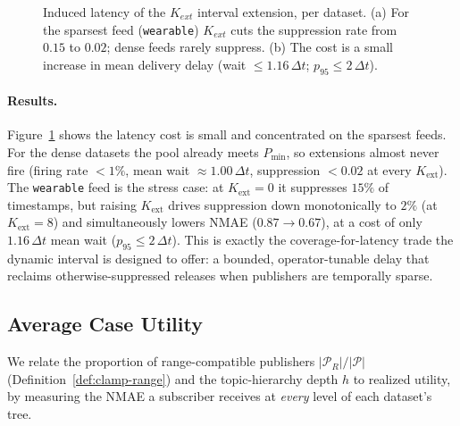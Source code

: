 \begin{figure}[t]
\begin{subfigure}{0.49\linewidth}
\end{subfigure}
\caption{Induced latency of the $K_{ext}$ interval extension, per dataset. (a) For the sparsest feed (\texttt{wearable}) $K_{ext}$ cuts the suppression rate from $0.15$ to $0.02$; dense feeds rarely suppress. (b) The cost is a small increase in mean delivery delay (wait $\le 1.16\,\Delta t$; $p_{95}\le 2\,\Delta t$).}\label{fig:exp-latency}
\end{figure}

\paragraph{Results.} Figure~\ref{fig:exp-latency} shows the latency cost is small and concentrated on the sparsest feeds. For the dense datasets the pool already meets $P_{\min}$, so extensions almost never fire (firing rate $<1\%$, mean wait $\approx 1.00\,\Delta t$, suppression $<0.02$ at every $K_{\text{ext}}$). The \texttt{wearable} feed is the stress case: at $K_{\text{ext}}=0$ it suppresses $15\%$ of timestamps, but raising $K_{\text{ext}}$ drives suppression down monotonically to $2\%$ (at $K_{\text{ext}}=8$) and simultaneously lowers NMAE ($0.87\!\to\!0.67$), at a cost of only $1.16\,\Delta t$ mean wait ($p_{95}\le 2\,\Delta t$). This is exactly the coverage-for-latency trade the dynamic interval is designed to offer: a bounded, operator-tunable delay that reclaims otherwise-suppressed releases when publishers are temporally sparse.

\subsection{Average Case Utility}
\label{sec:average-utility}
We relate the proportion of range-compatible publishers $|\mathcal{P}_R|/|\mathcal{P}|$ (Definition~\ref{def:clamp-range}) and the topic-hierarchy depth $h$ to realized utility, by measuring the NMAE a subscriber receives at \emph{every} level of each dataset's tree.

